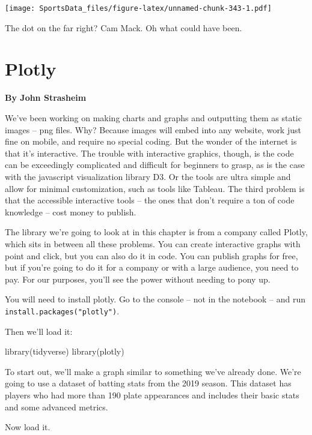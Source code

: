 \documentclass[
]{book}
\newenvironment{Shaded}{\begin{snugshade}}{\end{snugshade}}
\newcommand{\FunctionTok}[1]{\textcolor[rgb]{0.00,0.00,0.00}{#1}}
\newcommand{\NormalTok}[1]{#1}
\begin{document}
\texttt{[image: SportsData\_files/figure-latex/unnamed-chunk-343-1.pdf]}

The dot on the far right? Cam Mack. Oh what could have been.

\hypertarget{plotly}{%
\chapter{Plotly}\label{plotly}}

\textbf{By John Strasheim}

We've been working on making charts and graphs and outputting them as static images -- png files. Why? Because images will embed into any website, work just fine on mobile, and require no special coding. But the wonder of the internet is that it's interactive. The trouble with interactive graphics, though, is the code can be exceedingly complicated and difficult for beginners to grasp, as is the case with the javascript visualization library D3. Or the tools are ultra simple and allow for minimal customization, such as tools like Tableau. The third problem is that the accessible interactive tools -- the ones that don't require a ton of code knowledge -- cost money to publish.

The library we're going to look at in this chapter is from a company called Plotly, which sits in between all these problems. You can create interactive graphs with point and click, but you can also do it in code. You can publish graphs for free, but if you're going to do it for a company or with a large audience, you need to pay. For our purposes, you'll see the power without needing to pony up.

You will need to install plotly. Go to the console -- not in the notebook -- and run \texttt{install.packages("plotly")}.

Then we'll load it:

\begin{Shaded}
\begin{Highlighting}[]
\FunctionTok{library}\NormalTok{(tidyverse)}
\FunctionTok{library}\NormalTok{(plotly)}
\end{Highlighting}
\end{Shaded}

To start out, we'll make a graph similar to something we've already done. We're going to use a dataset of batting stats from the 2019 season. This dataset has players who had more than 190 plate appearances and includes their basic stats and some advanced metrics.

Now load it.
\end{document}
